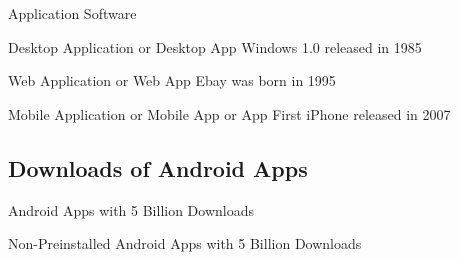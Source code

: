 \begin{frame}{Application Software}
	\begin{fancycolumns}[T,widths={46}]
		\begin{example}{Desktop Application or Desktop App}
			Windows 1.0 released in 1985
		\end{example}
	\nextcolumn
		\begin{example}{Web Application or Web App}
			Ebay was born in 1995
		\end{example}
		\hfill\pause
		\begin{example}{Mobile Application or Mobile App or App}
			First iPhone released in 2007
		\end{example}
	\end{fancycolumns}
\end{frame}


\subsection{Downloads of Android Apps}
\begin{frame}{Android Apps with 5 Billion Downloads }
	\centering{}
\end{frame}


\begin{frame}{Non-Preinstalled Android Apps with 5 Billion Downloads }
	\centering{}
\end{frame}

